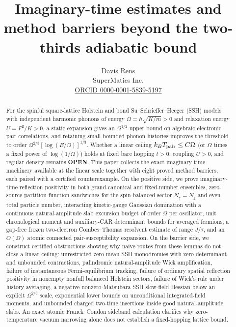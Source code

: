\documentclass[11pt]{article}
\title{Imaginary-time estimates and method barriers beyond the two-thirds adiabatic bound}
\author{Davis Rens\\SuperMatics Inc.\\\href{https://orcid.org/0000-0001-5839-5197}{ORCID 0000-0001-5839-5197}}
\date{}
\theoremstyle{remark}
\newcommand{\openstatus}{\textbf{OPEN}}
\begin{document}
\maketitle

\begin{abstract}
For the spinful square-lattice Holstein and bond Su--Schrieffer--Heeger (SSH) models with independent harmonic phonons of energy $\Omega=\hbar\sqrt{K/m}>0$ and relaxation energy $U=F^2/K>0$, a static expansion gives an $\Omega^{1/2}$ upper bound on algebraic electronic pair correlations, and retaining small bounded phonon histories improves the threshold to order $\Omega^{2/3}[\log(E/\Omega)]^{1/3}$. Whether a linear ceiling $k_BT_{\rm pair}\le C\Omega$ (or $\Omega$ times a fixed power of $\log(1/\Omega)$) holds at fixed bare hopping $t>0$, coupling $U>0$, and regular density remains \openstatus. This paper collects the exact imaginary-time machinery available at the linear scale together with eight proved method barriers, each paired with a certified counterexample. On the positive side, we prove imaginary-time reflection positivity in both grand-canonical and fixed-number ensembles, zero-source partition-function sandwiches for the spin-balanced sector $N_\uparrow=N_\downarrow$ and even total particle number, interacting kinetic-gauge Gaussian domination with a continuous natural-amplitude slab excursion budget of order $\Omega$ per oscillator, unit chronological moment and auxiliary-CAR determinant bounds for averaged fermions, a gap-free frozen two-electron Combes--Thomas resolvent estimate of range $J/\tau$, and an $O(\Omega)$ atomic connected pair-susceptibility expansion. On the barrier side, we construct certified obstructions showing why naive routes from these lemmas do not close a linear ceiling: unrestricted zero-mean SSH monodromies with zero determinant and unbounded contractions, palindromic natural-amplitude Wick amplification, failure of instantaneous Fermi-equilibrium tracking, failure of ordinary spatial reflection positivity in nonempty nonfull balanced Holstein sectors, failure of Wick's rule under history averaging, a negative nonzero-Matsubara SSH slow-field Hessian below an explicit $\Omega^{2/3}$ scale, exponential lower bounds on unconditional integrated-field moments, and unbounded charged two-time insertions inside good natural-amplitude slabs. An exact atomic Franck--Condon sideband calculation clarifies why zero-temperature vacuum narrowing alone does not establish a fixed-hopping lattice bound.
\end{abstract}
\end{document}
